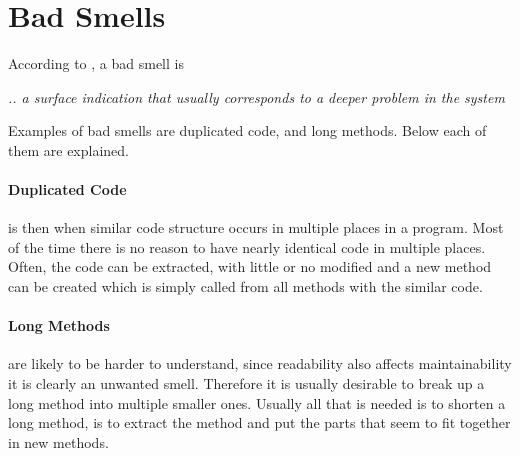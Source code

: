 \section{Bad Smells}
According to \citet{code:smell}, a bad smell is 
\begin{center}
\textit{.. a surface indication that usually corresponds to a deeper problem in the system}
\end{center}

Examples of bad smells are duplicated code, and long methods. Below each of them are explained. 

\paragraph{Duplicated Code} is then when similar code structure occurs in multiple places in a program. Most of the time there is no reason to have nearly identical code in multiple places. Often, the code can be extracted, with little or no modified and a new method can be created which is simply called from all methods with the similar code. 

\paragraph{Long Methods} are likely to be harder to understand, since readability also affects maintainability it is clearly an unwanted smell. Therefore it is usually desirable to break up a long method into multiple smaller ones. Usually all that is needed is to shorten a long method, is to extract the method and put the parts that seem to fit together in new methods.

